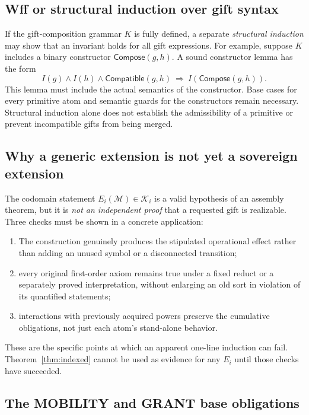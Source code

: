 \documentclass[11pt,letterpaper]{article}
\theoremstyle{definition}
\begin{document}
\subsection{Wff or structural induction over gift syntax}

If the gift-composition grammar \(K\) is fully defined, a separate \emph{structural induction} may show that an invariant holds for all gift expressions. For example, suppose \(K\) includes a binary constructor \(\mathsf{Compose}(g,h)\). A sound constructor lemma has the form
\[
I(g)\wedge I(h)\wedge \mathsf{Compatible}(g,h)
\ \Longrightarrow\ I(\mathsf{Compose}(g,h)).
\]
This lemma must include the actual semantics of the constructor. Base cases for every primitive atom and semantic guards for the constructors remain necessary. Structural induction alone does not establish the admissibility of a primitive or prevent incompatible gifts from being merged.

\subsection{Why a generic extension is not yet a sovereign extension}

The codomain statement $E_i(\mathcal M)\in\mathcal K_i$ is a valid hypothesis of an assembly theorem, but it is \emph{not an independent proof} that a requested gift is realizable. Three checks must be shown in a concrete application:
\begin{enumerate}[label=(\alph*)]
\item The construction genuinely produces the stipulated operational effect rather than adding an unused symbol or a disconnected transition;
\item every original first-order axiom remains true under a fixed reduct or a separately proved interpretation, without enlarging an old sort in violation of its quantified statements;
\item interactions with previously acquired powers preserve the cumulative obligations, not just each atom's stand-alone behavior.
\end{enumerate}
These are the specific points at which an apparent one-line induction can fail. Theorem~\ref{thm:indexed} cannot be used as evidence for any $E_i$ until those checks have succeeded.

\subsection{The MOBILITY and GRANT base obligations}
\end{document}
